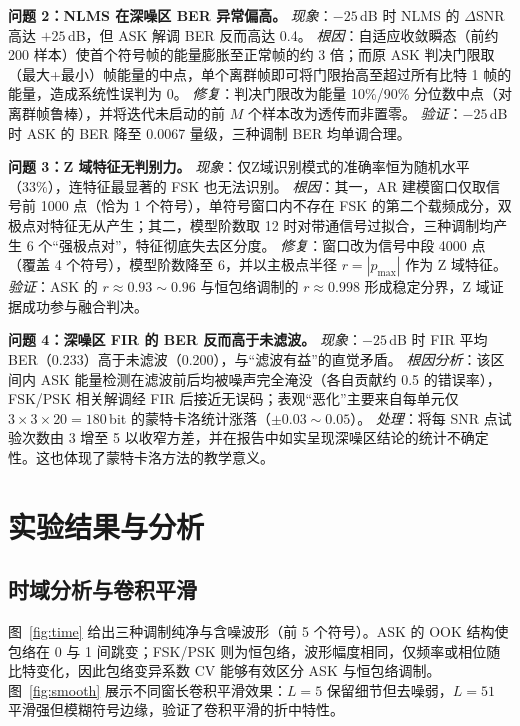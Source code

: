 \documentclass[12pt, a4paper, UTF8]{ctexart}
\begin{document}
\textbf{问题 2：NLMS 在深噪区 BER 异常偏高。}
\textit{现象}：$-25$\,dB 时 NLMS 的 $\Delta$SNR 高达 $+25$\,dB，但 ASK 解调 BER 反而高达 0.4。
\textit{根因}：自适应收敛瞬态（前约 200 样本）使首个符号帧的能量膨胀至正常帧的约 3 倍；而原 ASK 判决门限取（最大+最小）帧能量的中点，单个离群帧即可将门限抬高至超过所有比特 1 帧的能量，造成系统性误判为 0。
\textit{修复}：判决门限改为能量 10\%/90\% 分位数中点（对离群帧鲁棒），并将迭代未启动的前 $M$ 个样本改为透传而非置零。
\textit{验证}：$-25$\,dB 时 ASK 的 BER 降至 0.0067 量级，三种调制 BER 均单调合理。

\textbf{问题 3：Z 域特征无判别力。}
\textit{现象}：仅Z域识别模式的准确率恒为随机水平（33\%），连特征最显著的 FSK 也无法识别。
\textit{根因}：其一，AR 建模窗口仅取信号前 1000 点（恰为 1 个符号），单符号窗口内不存在 FSK 的第二个载频成分，双极点对特征无从产生；其二，模型阶数取 12 时对带通信号过拟合，三种调制均产生 6 个``强极点对''，特征彻底失去区分度。
\textit{修复}：窗口改为信号中段 4000 点（覆盖 4 个符号），模型阶数降至 6，并以主极点半径 $r=|p_{\max}|$ 作为 Z 域特征。
\textit{验证}：ASK 的 $r\approx 0.93\sim0.96$ 与恒包络调制的 $r\approx 0.998$ 形成稳定分界，Z 域证据成功参与融合判决。

\textbf{问题 4：深噪区 FIR 的 BER 反而高于未滤波。}
\textit{现象}：$-25$\,dB 时 FIR 平均 BER（0.233）高于未滤波（0.200），与``滤波有益''的直觉矛盾。
\textit{根因分析}：该区间内 ASK 能量检测在滤波前后均被噪声完全淹没（各自贡献约 0.5 的错误率），FSK/PSK 相关解调经 FIR 后接近无误码；表观``恶化''主要来自每单元仅 $3\times3\times20=180$\,bit 的蒙特卡洛统计涨落（$\pm 0.03\sim0.05$）。
\textit{处理}：将每 SNR 点试验次数由 3 增至 5 以收窄方差，并在报告中如实呈现深噪区结论的统计不确定性。这也体现了蒙特卡洛方法的教学意义。

\section{实验结果与分析}

\subsection{时域分析与卷积平滑}

图~\ref{fig:time} 给出三种调制纯净与含噪波形（前 5 个符号）。ASK 的 OOK 结构使包络在 0 与 1 间跳变；FSK/PSK 则为恒包络，波形幅度相同，仅频率或相位随比特变化，因此包络变异系数 CV 能够有效区分 ASK 与恒包络调制。图~\ref{fig:smooth} 展示不同窗长卷积平滑效果：$L=5$ 保留细节但去噪弱，$L=51$ 平滑强但模糊符号边缘，验证了卷积平滑的折中特性。
\end{document}

